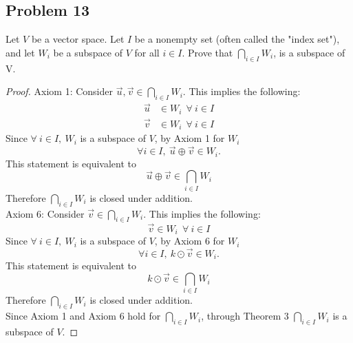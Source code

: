 \subsection*{Problem 13}
Let $V$ be a vector space. Let $I$ be a nonempty set (often called the "index set"), and let $W_i$ be a subspace of $V$ for all $i \in I$. Prove that $\displaystyle \bigcap_{i \in I} W_i$, is a subspace of V.
\begin{proof}
  Axiom 1: Consider $\vec{u}, \vec{v} \in \displaystyle \bigcap_{i \in I} W_i$. This implies the following:
  \begin{align*}
    \vec{u} & \in W_i~~\forall~i \in I \\
    \vec{v} & \in W_i~~\forall~i \in I
  \end{align*}
  Since $\forall~i \in I,~W_i$ is a subspace of $V$, by Axiom 1 for $W_i$
  \[
    \forall i \in I,~\vec{u} \oplus \vec{v} \in W_i.
  \]
  This statement is equivalent to
  \[
    \vec{u} \oplus \vec{v} \in \bigcap_{i \in I} W_i
  \]
  Therefore $\displaystyle \bigcap_{i \in I} W_i$ is closed under addition. \\
  Axiom 6: Consider $\vec{v} \in \displaystyle \bigcap_{i \in I} W_i$. This implies the following:
  \[
    \vec{v} \in W_i~~\forall~i \in I
  \]
  Since $\forall~i \in I,~W_i$ is a subspace of $V$, by Axiom 6 for $W_i$
  \[
    \forall i \in I,~k \odot \vec{v} \in W_i.
  \]
  This statement is equivalent to
  \[
    k \odot \vec{v} \in \bigcap_{i \in I} W_i
  \]
  Therefore $\displaystyle \bigcap_{i \in I} W_i$ is closed under addition. \\
  Since Axiom 1 and Axiom 6 hold for $\displaystyle \bigcap_{i \in I} W_i$, through Theorem 3 $\displaystyle \bigcap_{i \in I} W_i$ is a subspace of $V$.
\end{proof}

